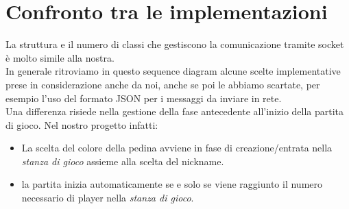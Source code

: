 \documentclass[12pt]{article}
\begin{document}
\section{Confronto tra le implementazioni}
La struttura e il numero di classi che gestiscono la comunicazione tramite socket è molto simile alla nostra.\\
In generale ritroviamo in questo sequence diagram alcune scelte implementative prese in considerazione anche da noi, anche se poi le abbiamo scartate, per esempio l'uso del formato JSON per i messaggi da inviare in rete.\\
Una differenza risiede nella gestione della fase antecedente all'inizio della partita di gioco. Nel nostro progetto infatti:
\begin{itemize}
    \item La scelta del colore della pedina avviene in fase di creazione/entrata nella \textit{stanza di gioco} assieme alla scelta del nickname.
    \item la partita inizia automaticamente se e solo se viene raggiunto il numero necessario di player nella \textit{stanza di gioco}.
\end{itemize}
\end{document}
